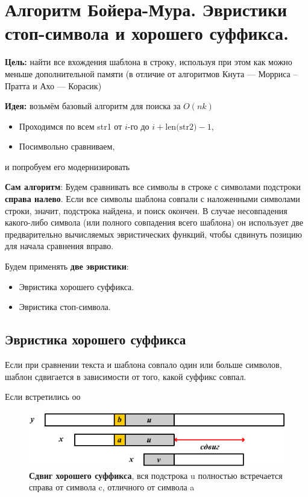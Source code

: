 \section{Алгоритм Бойера-Мура. Эвристики стоп-символа и хорошего суффикса.}

\textbf{Цель:} найти все вхождения шаблона в строку, используя при этом как можно меньше дополнительной памяти (в отличие от алгоритмов Кнута --- Морриса -- Пратта и Ахо --- Корасик)

\textbf{Идея:} возьмём базовый алгоритм для поиска за $O(nk)$
\begin{itemize}
	\item Проходимся по всем \textsf{str1} от $i$-го до $i+\text{len(str2)}-1$,
	\item Посимвольно сравниваем,
\end{itemize}
и попробуем его модернизировать

\textbf{Сам алгоритм}:
Будем сравнивать все символы в строке с символами подстроки \textbf{справа налево}. 
Если все символы шаблона совпали с наложенными символами строки, значит, подстрока найдена, и поиск окончен. 
В случае несовпадения какого-либо символа (или полного совпадения всего шаблона) он использует две предварительно вычисляемых эвристических функций, чтобы сдвинуть позицию для начала сравнения вправо.

Будем применять \textbf{две эвристики}:
\begin{itemize}
	\item Эвристика хорошего суффикса.
	\item Эвристика стоп-символа.
\end{itemize}

\subsection*{Эвристика хорошего суффикса}

Если при сравнении текста и шаблона совпало один или больше символов, шаблон сдвигается в зависимости от того, какой суффикс совпал.

Если встретились оо
\begin{figure}[h!]
	\centering
	\includegraphics[width=0.7\linewidth]{img/10_1.png}
	\captionsetup{labelformat=empty}
	\caption{\textbf{Сдвиг хорошего суффикса}, вся подстрока u полностью встречается справа от символа c, отличного от символа a}
\end{figure}

